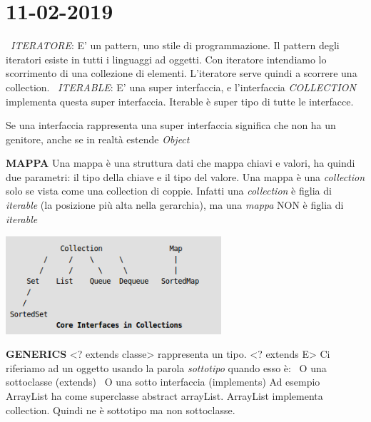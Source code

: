 

\newpage
\section{11-02-2019}
\textbullet\  \textit{ITERATORE}: E' un pattern, uno stile di programmazione. Il pattern degli iteratori esiste in tutti i linguaggi ad oggetti. Con iteratore intendiamo lo scorrimento di una collezione di elementi. L'iteratore serve quindi a scorrere una collection.\newline
\textbullet\ \textit{ITERABLE}: E' una super interfaccia, e l'interfaccia \textit{COLLECTION} implementa questa super interfaccia. Iterable è super tipo di tutte le interfacce.

\noindent Se una interfaccia rappresenta una super interfaccia significa che non ha un genitore, anche se in realtà estende \textit{Object}


\noindent \textbf{MAPPA}\newline
Una mappa è una struttura dati che mappa chiavi e valori, ha quindi due parametri: il tipo della chiave e il tipo del valore. Una mappa è una \textit{collection} solo se vista come una collection di coppie. Infatti una \textit{collection} è figlia di \textit{iterable} (la posizione più alta nella gerarchia), ma una \textit{mappa} NON è figlia di \textit{iterable}
\begin{center}
\includegraphics[width=%
0.6\textwidth]{MapInterface}
\end{center} 

\noindent \textbf{GENERICS}\newline
<? extends classe> rappresenta un tipo. \newline
<? extends E> \newline
Ci riferiamo ad un oggetto usando la parola \textit{sottotipo} quando esso è:\newline
\textbullet\ O una sottoclasse (extends) \newline
\textbullet\ O una sotto interfaccia (implements) \newline
Ad esempio ArrayList ha come superclasse abstract arrayList. ArrayList implementa collection. Quindi ne è sottotipo ma non sottoclasse.

